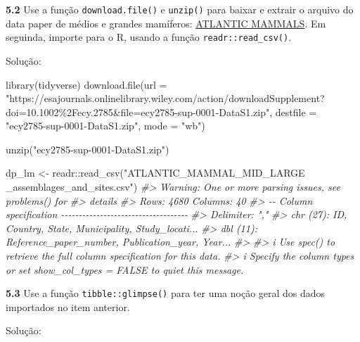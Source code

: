 \documentclass[
]{book}
\newenvironment{Shaded}{\begin{snugshade}}{\end{snugshade}}
\newcommand{\AttributeTok}[1]{\textcolor[rgb]{0.77,0.63,0.00}{#1}}
\newcommand{\CommentTok}[1]{\textcolor[rgb]{0.56,0.35,0.01}{\textit{#1}}}
\newcommand{\FunctionTok}[1]{\textcolor[rgb]{0.00,0.00,0.00}{#1}}
\newcommand{\NormalTok}[1]{#1}
\newcommand{\OtherTok}[1]{\textcolor[rgb]{0.56,0.35,0.01}{#1}}
\newcommand{\SpecialCharTok}[1]{\textcolor[rgb]{0.00,0.00,0.00}{#1}}
\newcommand{\StringTok}[1]{\textcolor[rgb]{0.31,0.60,0.02}{#1}}
\begin{document}
\textbf{5.2}
Use a função \texttt{download.file()} e \texttt{unzip()} para baixar e extrair o arquivo do data paper de médios e grandes mamíferos: \href{https://doi.org/10.1002/ecy.2785}{ATLANTIC MAMMALS}. Em seguinda, importe para o R, usando a função \texttt{readr::read\_csv()}.

Solução:

\begin{Shaded}
\begin{Highlighting}[]
\FunctionTok{library}\NormalTok{(tidyverse)}
\FunctionTok{download.file}\NormalTok{(}\AttributeTok{url =} \StringTok{"https://esajournals.onlinelibrary.wiley.com/action/downloadSupplement?doi=10.1002\%2Fecy.2785\&file=ecy2785{-}sup{-}0001{-}DataS1.zip"}\NormalTok{, }
              \AttributeTok{destfile =} \StringTok{"ecy2785{-}sup{-}0001{-}DataS1.zip"}\NormalTok{, }\AttributeTok{mode =} \StringTok{"wb"}\NormalTok{)}

\FunctionTok{unzip}\NormalTok{(}\StringTok{"ecy2785{-}sup{-}0001{-}DataS1.zip"}\NormalTok{)}

\NormalTok{dp\_lm }\OtherTok{\textless{}{-}}\NormalTok{ readr}\SpecialCharTok{::}\FunctionTok{read\_csv}\NormalTok{(}\StringTok{"ATLANTIC\_MAMMAL\_MID\_LARGE \_assemblages\_and\_sites.csv"}\NormalTok{)}
\CommentTok{\#\textgreater{} Warning: One or more parsing issues, see \textasciigrave{}problems()\textasciigrave{} for}
\CommentTok{\#\textgreater{} details}
\CommentTok{\#\textgreater{} Rows: 4680 Columns: 40}
\CommentTok{\#\textgreater{} {-}{-} Column specification {-}{-}{-}{-}{-}{-}{-}{-}{-}{-}{-}{-}{-}{-}{-}{-}{-}{-}{-}{-}{-}{-}{-}{-}{-}{-}{-}{-}{-}{-}{-}{-}{-}{-}{-}{-}}
\CommentTok{\#\textgreater{} Delimiter: ","}
\CommentTok{\#\textgreater{} chr (27): ID, Country, State, Municipality, Study\_locati...}
\CommentTok{\#\textgreater{} dbl (11): Reference\_paper\_number, Publication\_year, Year...}
\CommentTok{\#\textgreater{} }
\CommentTok{\#\textgreater{} i Use \textasciigrave{}spec()\textasciigrave{} to retrieve the full column specification for this data.}
\CommentTok{\#\textgreater{} i Specify the column types or set \textasciigrave{}show\_col\_types = FALSE\textasciigrave{} to quiet this message.}
\end{Highlighting}
\end{Shaded}

\textbf{5.3}
Use a função \texttt{tibble::glimpse()} para ter uma noção geral dos dados importados no item anterior.

Solução:
\end{document}
